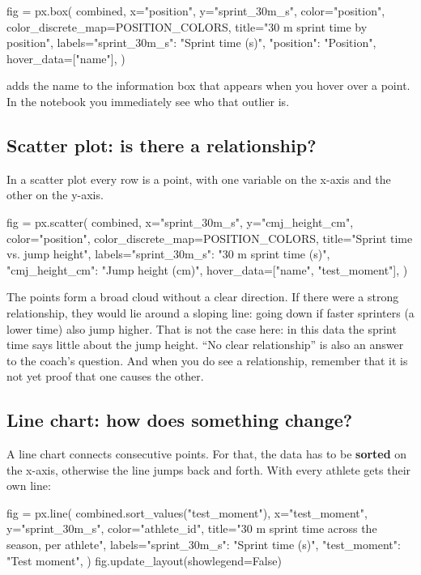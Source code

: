 \documentclass[11pt,a4paper]{article}
\begin{document}
\begin{python}[fig=boxplot]
fig = px.box(
    combined, x="position", y="sprint_30m_s",
    color="position", color_discrete_map=POSITION_COLORS,
    title="30 m sprint time by position",
    labels={"sprint_30m_s": "Sprint time (s)", "position": "Position"},
    hover_data=["name"],
)
\end{python}

 adds the name to the information box that
appears when you hover over a point. In the notebook you immediately see
who that outlier is.

\subsection{Scatter plot: is there a relationship?}

In a scatter plot every row is a point, with one variable on the x-axis
and the other on the y-axis.

\begin{python}[fig=scatter]
fig = px.scatter(
    combined, x="sprint_30m_s", y="cmj_height_cm",
    color="position", color_discrete_map=POSITION_COLORS,
    title="Sprint time vs. jump height",
    labels={"sprint_30m_s": "30 m sprint time (s)", "cmj_height_cm": "Jump height (cm)"},
    hover_data=["name", "test_moment"],
)
\end{python}

The points form a broad cloud without a clear direction. If there were a
strong relationship, they would lie around a sloping line: going down if
faster sprinters (a lower time) also jump higher. That is not the case
here: in this data the sprint time says little about the jump height.
``No clear relationship'' is also an answer to the coach's question. And
when you do see a relationship, remember that it is not yet proof that
one causes the other.

\subsection{Line chart: how does something change?}

A line chart connects consecutive points. For that, the data has to be
\textbf{sorted} on the x-axis, otherwise the line jumps back and forth.
With  every athlete gets their own line:

\begin{python}[fig=line]
fig = px.line(
    combined.sort_values("test_moment"), x="test_moment", y="sprint_30m_s",
    color="athlete_id",
    title="30 m sprint time across the season, per athlete",
    labels={"sprint_30m_s": "Sprint time (s)", "test_moment": "Test moment"},
)
fig.update_layout(showlegend=False)
\end{python}
\end{document}
